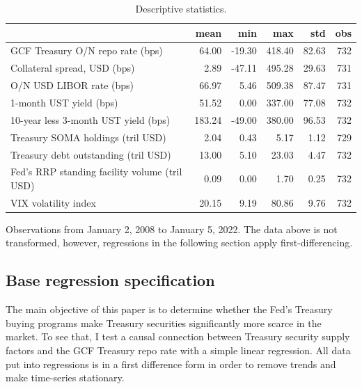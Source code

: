 \documentclass[11pt,a4paper,english,oneside]{article}
\begin{document}
\begin{table}[!h] \centering
\begin{threeparttable}
\caption{Descriptive statistics.}
\label{table:stats}
\begin{tabular}{lrrrrr}
\toprule
{} &    mean &    min &     max &    std &  obs \\
\midrule
GCF Treasury O/N repo rate (bps) &   64.00 & -19.30 &  418.40 &  82.63 &  732 \\
Collateral spread, USD (bps) &    2.89 & -47.11 &  495.28 &  29.63 &  731 \\
O/N USD LIBOR rate (bps) &   66.97 &   5.46 &  509.38 &  87.47 &  731 \\
1-month UST yield (bps) &   51.52 &   0.00 &  337.00 &  77.08 &  732 \\
10-year less 3-month UST yield (bps) &  183.24 & -49.00 &  380.00 &  96.53 &  732 \\
Treasury SOMA holdings (tril USD) &    2.04 &   0.43 &    5.17 &   1.12 &  729 \\
Treasury debt outstanding (tril USD) &   13.00 &   5.10 &   23.03 &   4.47 &  732 \\
Fed's RRP standing facility volume (tril USD) &    0.09 &   0.00 &    1.70 &   0.25 &  732 \\
VIX volatility index &   20.15 &   9.19 &   80.86 &   9.76 &  732 \\
\bottomrule
\end{tabular}
Observations from January 2, 2008 to January 5, 2022. The data above is not transformed, however, regressions in the following section apply first-differencing.
\end{threeparttable}
\end{table}

\subsection{Base regression specification} \label{sec:base}

The main objective of this paper is to determine whether the Fed's Treasury buying programs make Treasury securities significantly more scarce in the market. To see that, I test a causal connection between Treasury security supply factors and the GCF Treasury repo rate with a simple linear regression. All data put into regressions is in a first difference form in order to remove trends and make time-series stationary.
\end{document}
